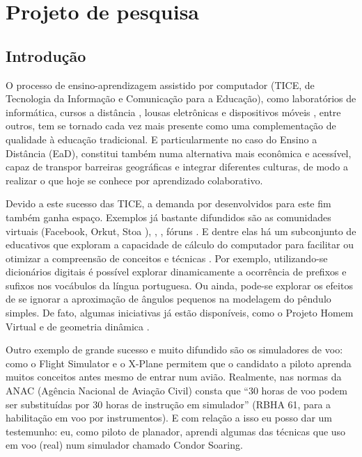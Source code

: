 \chapter{Projeto de pesquisa}
\label{cap:projeto-pesquisa}

\section{Introdução}

O processo de ensino-aprendizagem assistido por computador (TICE, de Tecnologia da Informação e Comunicação para a Educação), como laboratórios de informática, cursos a distância \cite{mit, redefor}, lousas eletrônicas \cite{aulas-interativas} e dispositivos móveis \cite{ipad}, entre outros, tem se tornado cada vez mais presente como uma complementação de qualidade à educação tradicional. E particularmente no caso do Ensino a Distância (EaD), constitui também numa alternativa mais econômica e acessível, capaz de transpor barreiras geográficas e integrar diferentes culturas, de modo a realizar o que hoje se conhece por aprendizado colaborativo.

Devido a este sucesso das TICE, a demanda por  desenvolvidos para este fim também ganha espaço. Exemplos já bastante difundidos são as comunidades virtuais (Facebook, Orkut, Stoa \etc), , , fóruns \etc. E dentre elas há um subconjunto de  educativos que exploram a capacidade de cálculo do computador para facilitar ou otimizar a compreensão de conceitos e técnicas \cite{melare-2009}. Por exemplo, utilizando-se dicionários digitais é possível explorar dinamicamente a ocorrência de prefixos e sufixos nos vocábulos da língua portuguesa. Ou ainda, pode-se explorar os efeitos de se ignorar a aproximação de ângulos pequenos na modelagem do pêndulo simples. De fato, algumas iniciativas já estão disponíveis, como o Projeto Homem Virtual \cite{homem-virtual} e  de geometria dinâmica \cite{geogebra, igeom}.

Outro exemplo de grande sucesso e muito difundido são os simuladores de voo:  como o Flight Simulator e o X-Plane permitem que o candidato a piloto aprenda muitos conceitos antes mesmo de entrar num avião. Realmente, nas normas da ANAC (Agência Nacional de Aviação Civil) consta que ``30 horas de voo podem ser substituídas por 30 horas de instrução em simulador'' (RBHA 61, para a habilitação em voo por instrumentos). E com relação a isso eu posso dar um testemunho: eu, como piloto de planador, aprendi algumas das técnicas que uso em voo (real) num simulador chamado Condor Soaring.

